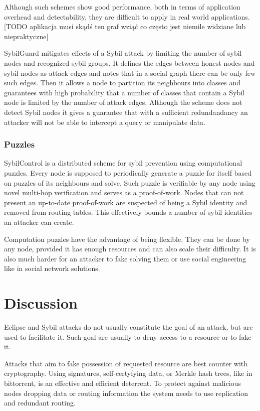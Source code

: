   Although such schemes show good performance, both in terms of application
  overhead and detectability, they are difficult to apply in real world
  applications.  [TODO aplikacja musi skądś ten graf wziąć co często jest
  niemile widziane lub niepraktyczne]

  SybilGuard \cite{hai06} mitigates effects of a Sybil attack by limiting the
  number of sybil nodes and recognized sybil groups. It defines the edges
  between honest nodes and sybil nodes as attack edges and notes that in a
  social graph there can be only few such edges. Then it allows a node to
  partition its neighbours into classes and guarantees with high probability
  that a number of classes that contain a Sybil node is limited by the number of
  attack edges. Although the scheme does not detect Sybil nodes it gives a
  guarantee that with a sufficient redundandancy an attacker will not be able to
  intercept a query or manipulate data.

  \subsubsection{Puzzles}
  SybilControl\cite{li12} is a distributed scheme for sybil prevention using
  computational puzzles. Every node is supposed to periodically generate a
  puzzle for itself based on puzzles of its neighbours and solve. Such puzzle
  is verifiable by any node using novel multi-hop verification and serves as a
  proof-of-work. Nodes that can not present an up-to-date proof-of-work are
  suspected of being a Sybil identity and removed from routing tables. This
  effectively bounds a number of sybil identities an attacker can create.

  Computation puzzles have the advantage of being flexible. They can be done by
  any node, provided it has enough resources and can also scale their
  difficulty. It is also much harder for an attacker to fake solving them or use
  social engineering like in social network solutions.

\section{Discussion}
  Eclipse and Sybil attacks do not usually constitute the goal of an attack, but
  are used to facilitate it. Such goal are usually to deny access to a resource
  or to fake it.

  Attacks that aim to fake possession of requested resource are best counter
  with cryptography. Using signatures, self-certyfying data, or Merkle hash
  trees, like in bittorrent, is an effective and efficient deterrent.
  To protect against malicious nodes dropping data or routing information the
  system needs to use replication and redundant routing. 

